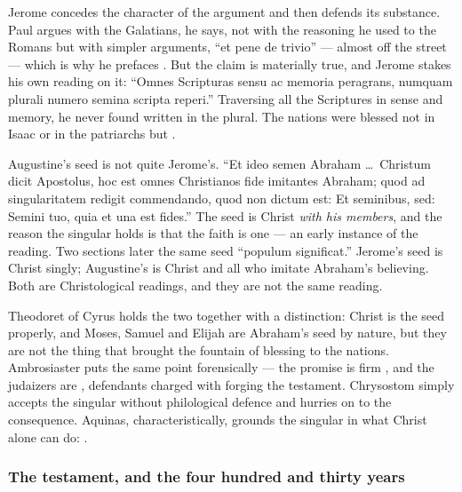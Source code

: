 \begin{witnessnote}
Jerome concedes the character of the argument and then defends its substance.
Paul argues with the Galatians, he says, not with the reasoning he used to the
Romans but with simpler arguments, ``et pene de trivio'' --- almost off the
street --- which is why he prefaces . But the
claim is materially true, and Jerome stakes his own reading on it: ``Omnes
Scripturas sensu ac memoria peragrans, numquam plurali numero semina scripta
reperi.'' Traversing all the Scriptures in sense and memory, he never found
 written in the plural. The nations were blessed not in Isaac or
in the patriarchs but .
\end{witnessnote}

\begin{witnessnote}
Augustine's seed is not quite Jerome's. ``Et ideo semen Abraham \dots\ Christum
dicit Apostolus, hoc est omnes Christianos fide imitantes Abraham; quod ad
singularitatem redigit commendando, quod non dictum est: Et seminibus, sed:
Semini tuo, quia et una est fides.'' The seed is Christ \textit{with his
members}, and the reason the singular holds is that the faith is one --- an
early instance of the  reading. Two sections later the
same seed ``populum significat.'' Jerome's seed is Christ singly; Augustine's
is Christ and all who imitate Abraham's believing. Both are Christological
readings, and they are not the same reading.
\end{witnessnote}

Theodoret of Cyrus holds the two together with a distinction: Christ is the
seed properly, and Moses, Samuel and Elijah are Abraham's seed by nature, but
they are not the thing that brought the fountain of blessing to the nations.
Ambrosiaster puts the same point forensically --- the promise is firm
, and the judaizers are
, defendants charged with forging the
testament. Chrysostom simply accepts the singular without philological
defence and hurries on to the consequence. Aquinas, characteristically,
grounds the singular in what Christ alone can do: .

\subsubsection*{The testament, and the four hundred and thirty years}

